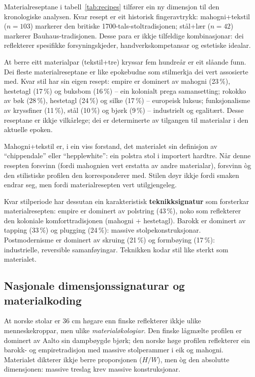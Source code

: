 \documentclass[10pt, a4paper, twocolumn]{article}
\begin{document}
Materialreseptane i tabell~\ref{tab:recipes} tilfører ein ny dimensjon til den kronologiske analysen. Kvar resept er eit historisk fingeravtrykk: mahogni+tekstil ($n = 103$) markerer den britiske 1700-tals-stoltradisjonen; stål+lær ($n = 42$) markerer Bauhaus-tradisjonen. Desse para er ikkje tilfeldige kombinasjonar: dei reflekterer spesifikke forsyningskjeder, handverkskompetansar og estetiske idealar.

At berre eitt materialpar (tekstil+tre) kryssar fem hundreår er eit slåande funn. Dei fleste materialreseptane er like epokebudne som stilmerkja dei vert assosierte med. Kvar stil har sin eigen resept: empire er dominert av mahogni (23\,\%), hestetagl (17\,\%) og buksbom (16\,\%) -- ein kolonialt prega samansetting; rokokko av bøk (28\,\%), hestetagl (24\,\%) og silke (17\,\%) -- europeisk luksus; funksjonalisme av kryssfiner (11\,\%), stål (10\,\%) og bjørk (9\,\%) -- industrielt og egalitært. Desse reseptane er ikkje vilkårlege; dei er determinerte av tilgangen til materialar i den aktuelle epoken.

Mahogni+tekstil er, i ein viss forstand, det materialet sin definisjon av ``chippendale'' eller ``hepplewhite'': ein polstra stol i importert hardtre. Når denne resepten forsvinn (fordi mahognien vert erstatta av andre materialar), forsvinn òg den stilistiske profilen den korresponderer med. Stilen døyr ikkje fordi smaken endrar seg, men fordi materialresepten vert utilgjengeleg.

Kvar stilperiode har dessutan ein karakteristisk \textbf{teknikksignatur} som forsterkar materialresepten: empire er dominert av polstring (43\,\%), noko som reflekterer den koloniale komforttradisjonen (mahogni + hestetagl). Barokk er dominert av tapping (33\,\%) og plugging (24\,\%): massive stolpekonstruksjonar. Postmodernisme er dominert av skruing (21\,\%) og formbøying (17\,\%): industrielle, reversible samanføyingar. Teknikken kodar stil like sterkt som materialet.


\subsection{Nasjonale dimensjonssignaturar og materialkoding}

At norske stolar er 36 cm høgare enn finske reflekterer ikkje ulike menneskekroppar, men ulike \emph{materialøkologiar}. Den finske lågmælte profilen er dominert av Aalto sin dampbøygde bjørk; den norske høge profilen reflekterer ein barokk- og empiretradisjon med massive stolperammer i eik og mahogni. Materialet dikterer ikkje berre proporsjonen ($H/W$), men òg den absolutte dimensjonen: massive treslag krev massive konstruksjonar.
\end{document}
